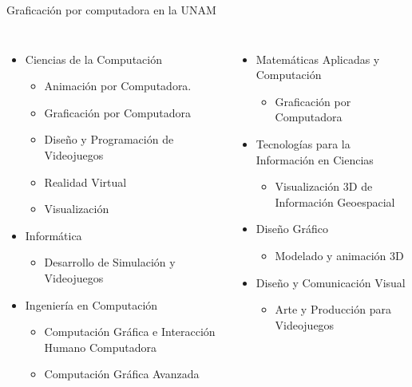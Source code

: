\begin{frame}{Graficación por computadora en la UNAM}
\begin{columns}
\begin{itemize}
    \item Ciencias de la Computación
    \begin{itemize}
        \item Animación por Computadora.
        \item Graficación por Computadora
        \item Diseño y Programación de Videojuegos
        \item Realidad Virtual
        \item Visualización
    \end{itemize}
    \item Informática
    \begin{itemize}
        \item Desarrollo de Simulación y Videojuegos
    \end{itemize}
    \item Ingeniería en Computación
    \begin{itemize}
        \item Computación Gráfica e Interacción Humano Computadora
        \item Computación Gráfica Avanzada
    \end{itemize}
\end{itemize}
\begin{itemize}
    \item Matemáticas Aplicadas y Computación
    \begin{itemize}
        \item Graficación por Computadora
    \end{itemize}
    \item Tecnologías para la Información en Ciencias
    \begin{itemize}
        \item Visualización 3D de Información Geoespacial
    \end{itemize}
    \item Diseño Gráfico
    \begin{itemize}
        \item Modelado y animación 3D
    \end{itemize}
    \item Diseño y Comunicación Visual
    \begin{itemize}
        \item Arte y Producción para Videojuegos
    \end{itemize}
\end{itemize}
\end{columns}
\end{frame}

